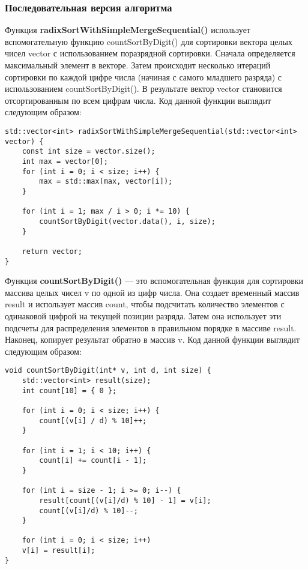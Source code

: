 \documentclass[a4paper, 14pt]{article}
\theoremstyle{plain}
\begin{document}
\subsubsection*{\centering Последовательная версия алгоритма}
Функция \textbf{radixSortWithSimpleMergeSequential()} использует вспомогательную функцию countSortByDigit() для сортировки вектора целых чисел vector с использованием поразрядной сортировки. Сначала определяется максимальный элемент в векторе. Затем происходит несколько итераций сортировки по каждой цифре числа (начиная с самого младшего разряда) с использованием countSortByDigit(). В результате вектор vector становится отсортированным по всем цифрам числа. Код данной функции выглядит следующим образом:
\vspace{-1.9em}
\begin{verbatim}
std::vector<int> radixSortWithSimpleMergeSequential(std::vector<int> vector) {
	const int size = vector.size();
	int max = vector[0];
	for (int i = 0; i < size; i++) {
		max = std::max(max, vector[i]);
	}
		
	for (int i = 1; max / i > 0; i *= 10) {
		countSortByDigit(vector.data(), i, size);
	}
		
	return vector;
}
\end{verbatim}

 
Функция \textbf{countSortByDigit()} --- это вспомогательная функция для сортировки массива целых чисел v по одной из цифр числа. Она создает временный массив result и использует массив count, чтобы подсчитать количество элементов с одинаковой цифрой на текущей позиции разряда. Затем она использует эти подсчеты для распределения элементов в правильном порядке в массиве result. Наконец, копирует результат обратно в массив v. Код данной функции выглядит следующим образом:
\vspace{-1.9em}
\begin{verbatim}
void countSortByDigit(int* v, int d, int size) {
	std::vector<int> result(size);
	int count[10] = { 0 };
	
	for (int i = 0; i < size; i++) {
		count[(v[i] / d) % 10]++;
	}
	
	for (int i = 1; i < 10; i++) {
		count[i] += count[i - 1];
	}
	
	for (int i = size - 1; i >= 0; i--) {
		result[count[(v[i]/d) % 10] - 1] = v[i];
		count[(v[i]/d) % 10]--;
	}
	
	for (int i = 0; i < size; i++)
	v[i] = result[i];
}
\end{verbatim}
\end{document}
